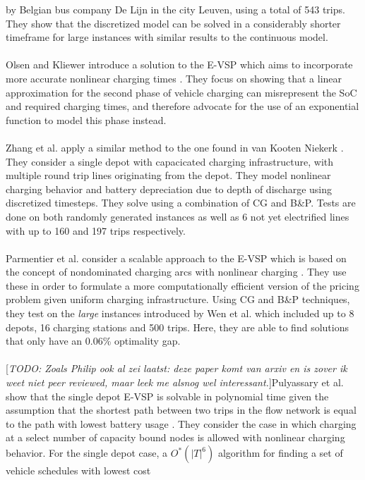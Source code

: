 \documentclass[]{article}
\newcommand{\todo}[1]{{\color{red}[\textit{TODO: #1}]}}
\begin{document}
by Belgian bus company De Lijn in the city Leuven, using a total of 543 trips. They show that the
discretized model can be solved in a considerably shorter timeframe for large instances with similar results to
the continuous model. \\\\
Olsen and Kliewer introduce a solution to the E-VSP which aims to incorporate
more accurate nonlinear charging times \cite{Olsen2020}. They focus on showing
that a linear approximation for the second phase of vehicle charging can
misrepresent the SoC and required charging times, and therefore advocate for
the use of an exponential function to model this phase instead. \\\\
Zhang et al. apply a similar method to the one found in van Kooten Niekerk
\cite{Zhang2021}. They consider a single depot with capacicated charging infrastructure,
with multiple round trip lines originating from the depot. They model
nonlinear charging behavior and battery depreciation due to depth of discharge using discretized timesteps. They solve
using a combination of CG and B\&P. Tests are done on both randomly generated
instances as well as 6 not yet electrified lines with up to 160 and 197 trips
respectively.\\\\
Parmentier et al. consider a scalable approach to the E-VSP which is based on
the concept of nondominated charging arcs with nonlinear charging
\cite{Parmentier2023}. They use these in order to formulate a more
computationally efficient version of the pricing problem given uniform charging
infrastructure. Using CG and B\&P techniques, they test on the \textit{large}
instances introduced by Wen et al. \cite{Wen2016} which included up to 8
depots, 16 charging stations and 500 trips. Here, they are able to find
solutions that only have an 0.06\% optimality gap. \\\\
\todo{Zoals Philip ook al zei laatst: deze paper komt van arxiv en is zover ik weet niet peer reviewed, maar leek me alsnog wel interessant.}Pulyassary et al. show that the single depot E-VSP is solvable in polynomial time given the
assumption that the shortest path between two trips in the flow network is
equal to the path with lowest battery usage \cite{Pulyassary2024}. They
consider the case in which charging at a select number of capacity bound nodes
is allowed with nonlinear charging behavior. For the single depot case, a
$O^*(|T|^6)$ algorithm for finding a set of vehicle schedules with lowest cost
\end{document}
